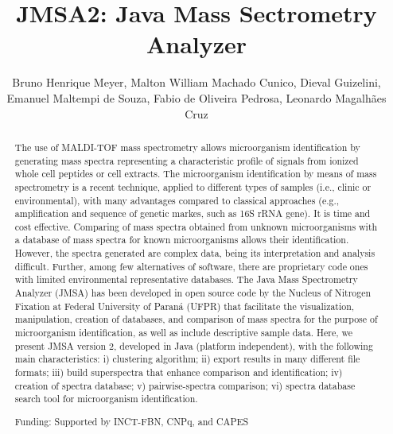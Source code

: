 \documentclass[twoside]{article}
\title{\vspace{-15mm}\fontsize{24pt}{10pt}\selectfont\textbf{ JMSA2: Java Mass Sectrometry Analyzer }} %
\author{ Bruno Henrique Meyer, Malton William Machado Cunico, Dieval Guizelini, Emanuel Maltempi de Souza, Fabio de Oliveira Pedrosa, Leonardo Magalh\~aes Cruz }
\affil{ Federal University of Parana }
\date{}
\begin{document}
  
  
  \maketitle %
  
  
  \thispagestyle{fancy} %
  
  
  \begin{abstract}
  The use of MALDI-TOF mass spectrometry allows microorganism identification by generating mass spectra representing a characteristic profile of signals from ionized whole cell peptides or cell extracts. The microorganism identification by means of mass spectrometry is a recent technique,  applied to different types of samples (i.e.,  clinic or environmental),  with many advantages compared to classical approaches (e.g.,  amplification and sequence of genetic markes,  such as 16S rRNA gene). It is time and cost effective. Comparing of mass spectra obtained from unknown microorganisms with a database of mass spectra for known microorganisms allows their identification. However,  the spectra generated are complex data,  being its interpretation and analysis difficult. Further,  among few alternatives of software,  there are proprietary code ones with limited environmental representative databases. The Java Mass Spectrometry Analyzer (JMSA) has been developed in open source code by the Nucleus of Nitrogen Fixation at Federal University of Paran\'a (UFPR) that facilitate the visualization,  manipulation,  creation of databases,  and comparison of mass spectra for the purpose of microorganism identification,  as well as include descriptive sample data. Here,  we present JMSA version 2,  developed in Java (platform independent),  with the following main characteristics: i) clustering algorithm; ii) export results in many different file formats; iii) build superspectra that enhance comparison and identification; iv) creation of spectra database; v) pairwise-spectra comparison; vi) spectra database search tool for microorganism identification.
  
  Funding: Supported by INCT-FBN,  CNPq,  and CAPES \\ 
  \end{abstract}
  
\end{document}
